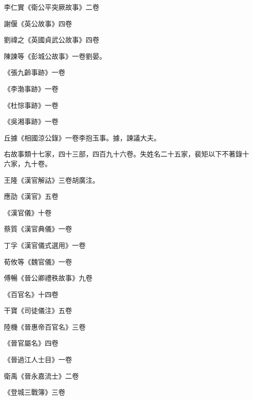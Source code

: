 \begin{pinyinscope}
 李仁實《衛公平突厥故事》二卷



 謝偃《英公故事》四卷



 劉禕之《英國貞武公故事》四卷



 陳諫等《彭城公故事》一卷劉晏。



 《張九齡事跡》一卷



 《李渤事跡》一卷



 《杜悰事跡》一卷



 《吳湘事跡》一卷



 丘據《相國涼公錄》一卷李抱玉事。據，諫議大夫。



 右故事類十七家，四十三部，四百九十六卷。失姓名二十五家，裴矩以下不著錄十六家，九十卷。



 王隆《漢官解詁》三卷胡廣注。



 應劭《漢官》五卷



 《漢官儀》十卷



 蔡質《漢官典儀》一卷



 丁孚《漢官儀式選用》一卷



 荀攸等《魏官儀》一卷



 傅暢《晉公卿禮秩故事》九卷



 《百官名》十四卷



 干寶《司徒儀注》五卷



 陸機《晉惠帝百官名》三卷



 《晉官屬名》四卷



 《晉過江人士目》一卷



 衛禹《晉永嘉流士》二卷



 《登城三戰簿》三卷




\end{pinyinscope}
